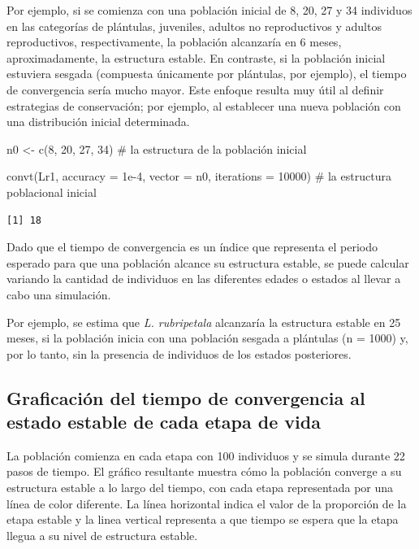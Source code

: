 \documentclass[
  12pt,
  letterpaper,
]{book}
\newenvironment{Shaded}{\begin{snugshade}}{\end{snugshade}}
\newcommand{\AttributeTok}[1]{\textcolor[rgb]{0.40,0.45,0.13}{#1}}
\newcommand{\CommentTok}[1]{\textcolor[rgb]{0.37,0.37,0.37}{#1}}
\newcommand{\DecValTok}[1]{\textcolor[rgb]{0.68,0.00,0.00}{#1}}
\newcommand{\FloatTok}[1]{\textcolor[rgb]{0.68,0.00,0.00}{#1}}
\newcommand{\FunctionTok}[1]{\textcolor[rgb]{0.28,0.35,0.67}{#1}}
\newcommand{\NormalTok}[1]{\textcolor[rgb]{0.00,0.23,0.31}{#1}}
\newcommand{\OtherTok}[1]{\textcolor[rgb]{0.00,0.23,0.31}{#1}}
\begin{document}
Por ejemplo, si se comienza con una población inicial de 8, 20, 27 y 34
individuos en las categorías de plántulas, juveniles, adultos no
reproductivos y adultos reproductivos, respectivamente, la población
alcanzaría en 6 meses, aproximadamente, la estructura estable. En
contraste, si la población inicial estuviera sesgada (compuesta
únicamente por plántulas, por ejemplo), el tiempo de convergencia sería
mucho mayor. Este enfoque resulta muy útil al definir estrategias de
conservación; por ejemplo, al establecer una nueva población con una
distribución inicial determinada.

\begin{Shaded}
\begin{Highlighting}[]
\NormalTok{n0 }\OtherTok{\textless{}{-}} \FunctionTok{c}\NormalTok{(}\DecValTok{8}\NormalTok{, }\DecValTok{20}\NormalTok{, }\DecValTok{27}\NormalTok{, }\DecValTok{34}\NormalTok{) }\CommentTok{\# la estructura de la población inicial}

\FunctionTok{convt}\NormalTok{(Lr1, }\AttributeTok{accuracy =} \FloatTok{1e{-}4}\NormalTok{, }\AttributeTok{vector =}\NormalTok{ n0, }\AttributeTok{iterations =} \DecValTok{10000}\NormalTok{) }\CommentTok{\# la estructura poblacional inicial}
\end{Highlighting}
\end{Shaded}

\begin{verbatim}
[1] 18
\end{verbatim}

Dado que el tiempo de convergencia es un índice que representa el
periodo esperado para que una población alcance su estructura estable,
se puede calcular variando la cantidad de individuos en las diferentes
edades o estados al llevar a cabo una simulación.

Por ejemplo, se estima que \emph{L. rubripetala} alcanzaría la
estructura estable en 25 meses, si la población inicia con una población
sesgada a plántulas (n = 1000) y, por lo tanto, sin la presencia de
individuos de los estados posteriores.

\subsection{Graficación del tiempo de convergencia al estado estable de
cada etapa de
vida}\label{graficaciuxf3n-del-tiempo-de-convergencia-al-estado-estable-de-cada-etapa-de-vida}

La población comienza en cada etapa con 100 individuos y se simula
durante 22 pasos de tiempo. El gráfico resultante muestra cómo la
población converge a su estructura estable a lo largo del tiempo, con
cada etapa representada por una línea de color diferente. La línea
horizontal indica el valor de la proporción de la etapa estable y la
linea vertical representa a que tiempo se espera que la etapa llegua a
su nivel de estructura estable.
\end{document}
